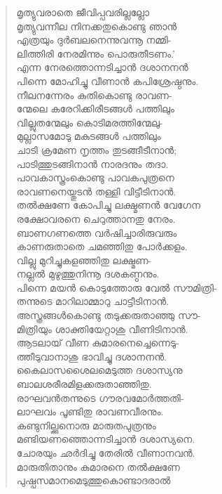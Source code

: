 \begin{verse}
മൃത്യുവരാതെ ജീവിപ്പവരില്ലല്ലോ\\
മൃത്യുവന്നീല നിനക്കതുകൊണ്ടു ഞാന്‍\\
എത്രയും ദുര്‍ബലനെന്നുവന്നൂ നമ്മി-\\
ലിത്തിരി നേരമിന്നും പൊരുതീടണം.’\\
എന്ന നേരത്തൊന്നടിച്ചാന്‍ ദശാനനന്‍\\
പിന്നെ മോഹിച്ചു വീണാന്‍ കപിശ്രേഷ്ഠനും.\\
നീലനന്നേരം കുതികൊണ്ടു രാവണ-\\
ന്മേലെ കരേറിക്കിരീടങ്ങള്‍ പത്തിലും\\
വില്ലുതന്മേലും കൊടിമരത്തിന്മേലു-\\
മുല്ലാസമോടു മകുടങ്ങള്‍ പത്തിലും\\
ചാടി ക്രമേണ നൃത്തം തുടങ്ങീടീനാന്‍;\\
പാടിത്തുടങ്ങിനാന്‍ നാരദനും തദാ.\\
പാവകാസ്ത്രംകൊണ്ടു പാവകപുത്രനെ\\
രാവണനെയ്തുടന്‍ തള്ളി വിട്ടീടിനാന്‍.\\
തല്‍ക്ഷണേ കോപിച്ചു ലക്ഷ്മണന്‍ വേഗേന\\
രക്ഷോവരനെ ചെറുത്താനതു നേരം.\\
ബാണഗണത്തെ വര്‍ഷിച്ചാരിരുവരും\\
കാണരുതാതെ ചമഞ്ഞിതു പോര്‍ക്കളം.\\
വില്ലു മുറിച്ചുകളഞ്ഞിതു ലക്ഷ്മണ-\\
നല്ലല്‍ മുഴുത്തുനിന്നൂ ദശകണ്ഠനും.\\
പിന്നെ മയന്‍ കൊടുത്തോരു വേല്‍ സൗമിത്രി-\\
തന്നുടെ മാറിലാമ്മാറു ചാട്ടീടിനാന്‍.\\
അസ്ത്രങ്ങള്‍കൊണ്ടു തടുക്കരുതാഞ്ഞു സൗ-\\
മിത്രിയും ശാക്തിയേറ്റാശു വീണിടിനാന്‍.\\
ആടലായ് വീണ കുമാരനെച്ചെന്നെടു-\\
ത്തീടുവാനാശു ഭാവിച്ചു ദശാനനന്‍.\\
കൈലാസശൈലമെടുത്ത ദശാസ്യനു\\
ബാലശരീരമിളക്കരുതാഞ്ഞിതു.\\
രാഘവന്‍തന്നുടെ ഗൗരവമോര്‍ത്തതി-\\
ലാഘവം പൂണ്ടിതു രാവണവീരനും.\\
കണ്ടുനില്ക്കുനൊരു മാരുതപുത്രനും\\
മണ്ടിയണഞ്ഞൊന്നടിച്ചാന്‍ ദശാസ്യനെ.\\
ചോരയും ഛര്‍ദിച്ചു തേരില്‍ വീണാനവന്‍.\\
മാരുതിതാനും കുമാരനെ തല്‍ക്ഷണേ\\
പുഷ്പസമാനമെടുത്തുകൊണ്ടാദരാല്‍\\

\end{verse}
